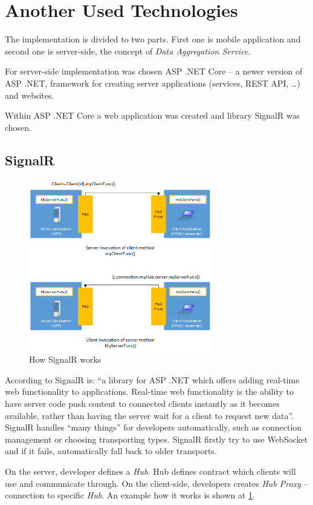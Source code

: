 \section{Another Used Technologies}
The implementation is divided to two parts. First one is mobile application and second one is server-side, the concept of \textit{Data Aggregation Service}. 

For server-side implementation was chosen ASP .NET Core -- a newer version of ASP .NET, framework for creating server applications  (services, REST API, \dots) and websites.

Within ASP .NET Core a web application was created and library SignalR was chosen.
\subsection{SignalR}
\begin{figure}[ht!]
\centering
\includegraphics[width=8cm,keepaspectratio]{img/signal-r-overview}
\caption{How SignalR works \cite{signal-r-overview}}
\label{fig:signal-r-overview}
\end{figure}
According to \cite{signal-r-overview} SignalR is: ``a library for ASP .NET which offers adding real-time web functionality to applications. Real-time web functionality is the ability to have server code push content to connected clients instantly as it becomes available, rather than having the server wait for a client to request new data''. SignalR handles ``many things'' for developers automatically, such as connection management or choosing transporting types. SignalR firstly try to use WebSocket and if it fails, automatically fall back to older transports.

On the server, developer defines a \textit{Hub}. Hub defines contract which clients will use and communicate through. On the client-side, developers creates \textit{Hub Proxy} -- connection to specific \textit{Hub}. An example how it works is shown at \cref{fig:signal-r-overview}.
